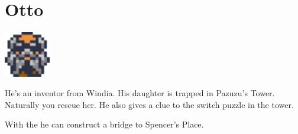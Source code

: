 \section{Otto}
\label{char:otto}

\includegraphics[height=2cm,keepaspectratio]{./resources/chars/otto}

He’s an inventor from Windia. His daughter  is trapped in Pazuzu’s Tower. Naturally you rescue her. He also gives a clue to the switch puzzle in the tower.

\vspace{1em}

With the  he can construct a bridge to Spencer’s Place.

